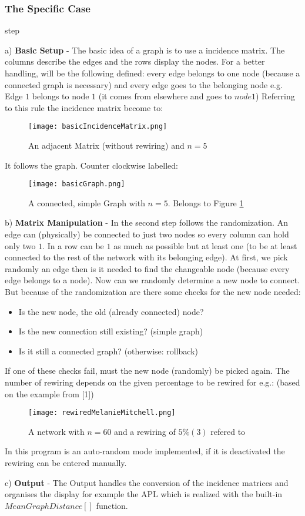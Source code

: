 \documentclass[11pt,a4paper]{article}
\begin{document}
 \subsubsection{The Specific Case}
\begin{labeling}{step}
\item [a)] \textbf{Basic Setup} - The  basic idea of a graph is to use a incidence matrix. The columns describe the edges and the rows display the nodes. For a better handling, will be the following defined: every edge belongs to one node (because a connected graph is necessary) and every edge goes to the belonging node e.g.
Edge \(1\) belongs to node \(1\) (it comes from elsewhere and goes to \(node 1\))
Referring to this rule the incidence matrix become to:
\begin{figure}[h]
\centering
\texttt{[image: basicIncidenceMatrix.png]}
\caption{An adjacent Matrix (without rewiring) and \(n=5\)}
\label{fig:basicMatrix}
\end{figure}
It follows the graph. Counter clockwise labelled:
\begin{figure}[h]
\centering
\texttt{[image: basicGraph.png]}
\caption{A connected, simple Graph with \(n=5\). Belongs to Figure \ref{fig:basicMatrix}}
\end{figure}
\item [b)] \textbf{Matrix Manipulation} - In the second step follows the randomization. An edge can (physically) be connected to just two nodes so every column can hold only two \(1\). In a row can be \(1\) as much as possible but at least one (to be at least connected to the rest of the network with its belonging edge). At first, we pick randomly an edge then is it needed to find the changeable node (because every edge belongs to a node). Now can we randomly determine a new node to connect. But because of the randomization are there some checks for the new node needed:
\begin{itemize}  
\item Is the new node, the old (already connected) node? 
\item Is the new connection still existing? (simple graph) 
\item Is it still a connected graph? (otherwise: rollback)
\end{itemize}
If one of these checks fail, must the new node (randomly) be picked again. The number of rewiring depends on the given percentage to be rewired for e.g.: (based on the example from [1])
\begin{figure}[h]
\centering
\texttt{[image: rewiredMelanieMitchell.png]}
\caption{A network with \(n=60\) and a rewiring of \(5\%(3)\) refered to \cite{melanie}}
\end{figure}
In this program is an auto-random mode implemented, if it is deactivated the rewiring can be entered manually.
\item [c)] \textbf{Output} - The Output handles the conversion of the incidence matrices and organises the display for example the APL which is realized with the built-in \(MeanGraphDistance[]\) function.
\end{labeling}
\end{document}
